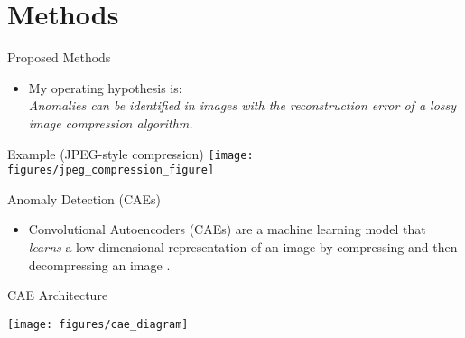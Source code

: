 \documentclass[10pt,handout]{beamer}
\begin{document}
\section{Methods}

\begin{frame}{Proposed Methods}
\begin{itemize}

\item My operating hypothesis is:\\ 
\alert{\textit{Anomalies can be identified in images with the reconstruction error of a lossy image compression algorithm.}}\\[0.5cm]
\end{itemize}


\begin{exampleblock}{Example (JPEG-style compression)}
\texttt{[image: figures/jpeg\_compression\_figure]}

\end{exampleblock}


\end{frame}

%
%
%
%
%
%
%

\begin{frame}{Anomaly Detection (CAEs)}

\begin{itemize}
\item Convolutional Autoencoders (CAEs) are a machine learning model that \textit{learns} a low-dimensional representation of an image by compressing and then decompressing an image \cite{wta_detection, attention_anomalies}.\\[0.5cm]
\end{itemize}

\begin{exampleblock}{CAE Architecture}
\begin{center}
\texttt{[image: figures/cae\_diagram]}
\end{center}
\end{exampleblock}

\end{frame}
\end{document}
